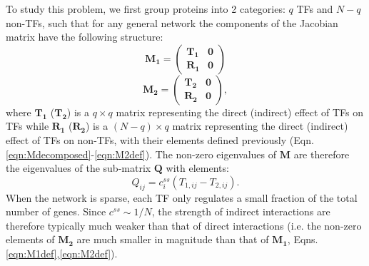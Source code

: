 \documentclass[10pt]{article}
\begin{document}
To study this problem, we first group proteins into 2 categories: $q$ TFs and $N-q$ non-TFs, such that for any general network the components of the Jacobian matrix have the following structure:
\begin{equation}
    \mathbf{M_1} = \begin{pmatrix} 
    \mathbf{T_1} & \mathbf{0} \\
    \mathbf{R_1} & \mathbf{0} 
    \end{pmatrix}
    \label{eqn:M1decomposed}
\end{equation}
\begin{equation}
    \mathbf{M_2} = \begin{pmatrix} 
    \mathbf{T_2} & \mathbf{0} \\
    \mathbf{R_2} & \mathbf{0} 
    \end{pmatrix},
    \label{eqn:M2decomposed}
\end{equation}
where  $\mathbf{T_1}$ ($\mathbf{T_2}$) is a $q \times q$ matrix representing the direct (indirect) effect of TFs on TFs while $\mathbf{R_1}$ ($\mathbf{R_2}$) is a $(N-q) \times q$ matrix representing the direct (indirect) effect of TFs on non-TFs, with their elements defined previously (Eqn.\ref{eqn:Mdecomposed}-\ref{eqn:M2def}). The non-zero eigenvalues of $\textbf{M}$ are therefore the eigenvalues of the sub-matrix $\mathbf{Q}$ with elements:
\begin{equation}
    Q_{ij} = c^{ss}_i (T_{1,ij}-T_{2,ij}).
    \label{eqn:Qmatdef}
\end{equation}
When the network is sparse, each TF only regulates a small fraction of the total number of genes. Since $c^{ss} \sim 1/N$, the strength of indirect interactions are therefore typically much weaker than that of direct interactions (i.e. the non-zero elements of $\mathbf{M_2}$ are much smaller in magnitude than that of $\mathbf{M_1}$, Eqns.\ref{eqn:M1def},\ref{eqn:M2def}). 
\end{document}
